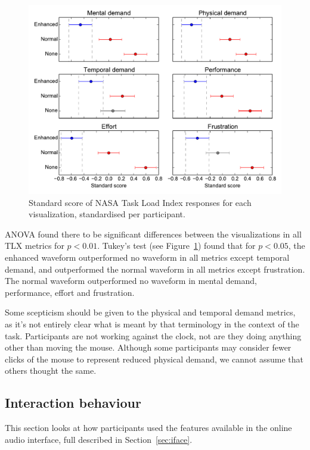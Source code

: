 \begin{figure}[p]
  \centering
  \includegraphics[width=\textwidth]{figs/tlx-std-tukey95.pdf}
  \caption{Standard score of NASA Task Load Index responses for each
    visualization, standardised per participant.}
  \label{fig:tlxtukey}
\end{figure}

ANOVA found there to be significant differences between the visualizations in
all TLX metrics for $p < 0.01$. Tukey's test (see Figure~\ref{fig:tlxtukey})
found that for $p < 0.05$, the enhanced waveform outperformed no waveform in
all metrics except temporal demand, and outperformed the normal waveform in
all metrics except frustration. The normal waveform outperformed no waveform in
mental demand, performance, effort and frustration.

Some scepticism should be given to the physical and temporal demand metrics, as
it's not entirely clear what is meant by that terminology in the context of the
task. Participants are not working against the clock, not are they doing
anything other than moving the mouse. Although some participants may consider
fewer clicks of the mouse to represent reduced physical demand, we cannot
assume that others thought the same.

\subsection{Interaction behaviour}
This section looks at how participants used the features available in the
online audio interface, full described in Section~\ref{sec:iface}.

